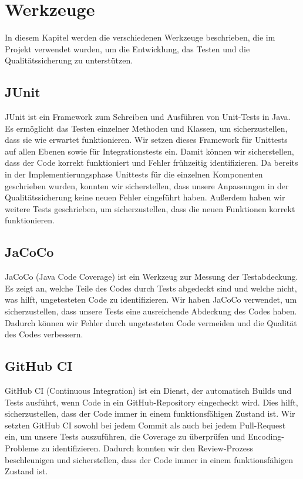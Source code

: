 
\chapter{Werkzeuge}
\label{ch:tools}

In diesem Kapitel werden die verschiedenen Werkzeuge beschrieben, die im Projekt verwendet wurden, um die Entwicklung, das Testen und die Qualitätssicherung zu unterstützen.

\section{JUnit}
JUnit ist ein Framework zum Schreiben und Ausführen von Unit-Tests in Java.
Es ermöglicht das Testen einzelner Methoden und Klassen, um sicherzustellen, dass sie wie erwartet funktionieren.
Wir setzen dieses Framework für Unittests auf allen Ebenen sowie für Integrationstests ein.
Damit können wir sicherstellen, dass der Code korrekt funktioniert und Fehler frühzeitig identifizieren.
Da bereits in der Implementierungsphase Unittests für die einzelnen Komponenten geschrieben wurden, konnten wir sicherstellen,
dass unsere Anpassungen in der Qualitätssicherung keine neuen Fehler eingeführt haben.
Außerdem haben wir weitere Tests geschrieben, um sicherzustellen, dass die neuen Funktionen korrekt funktionieren.

\section{JaCoCo}
JaCoCo (Java Code Coverage) ist ein Werkzeug zur Messung der Testabdeckung.
Es zeigt an, welche Teile des Codes durch Tests abgedeckt sind und welche nicht, was hilft, ungetesteten Code zu identifizieren.
Wir haben JaCoCo verwendet, um sicherzustellen, dass unsere Tests eine ausreichende Abdeckung des Codes haben.
Dadurch können wir Fehler durch ungetesteten Code vermeiden und die Qualität des Codes verbessern.

\section{GitHub CI}
GitHub CI (Continuous Integration) ist ein Dienst, der automatisch Builds und Tests ausführt, wenn Code in ein GitHub-Repository eingecheckt wird.
Dies hilft, sicherzustellen, dass der Code immer in einem funktionsfähigen Zustand ist.
Wir setzten GitHub CI sowohl bei jedem Commit als auch bei jedem Pull-Request ein,
um unsere Tests auszuführen, die Coverage zu überprüfen und Encoding-Probleme zu identifizieren.
Dadurch konnten wir den Review-Prozess beschleunigen und sicherstellen, dass der Code immer in einem funktionsfähigen Zustand ist.

